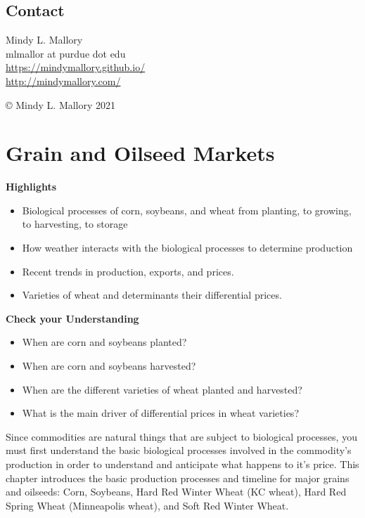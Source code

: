 \documentclass[
]{book}
\providecommand{\tightlist}{%
  \setlength{\itemsep}{0pt}\setlength{\parskip}{0pt}}
\begin{document}
\hypertarget{contact}{%
\section*{Contact}\label{contact}}

Mindy L. Mallory\\
mlmallor at purdue dot edu\\
\url{https://mindymallory.github.io/}~\\
\url{http://mindymallory.com/}

© Mindy L. Mallory 2021

\hypertarget{grain-and-oilseed-markets}{%
\chapter{Grain and Oilseed Markets}\label{grain-and-oilseed-markets}}

\textbf{Highlights}

\begin{itemize}
\tightlist
\item
  Biological processes of corn, soybeans, and wheat from planting, to growing, to harvesting, to storage
\item
  How weather interacts with the biological processes to determine production
\item
  Recent trends in production, exports, and prices.
\item
  Varieties of wheat and determinants their differential prices.
\end{itemize}

\textbf{Check your Understanding}

\begin{itemize}
\tightlist
\item
  When are corn and soybeans planted?
\item
  When are corn and soybeans harvested?
\item
  When are the different varieties of wheat planted and harvested?
\item
  What is the main driver of differential prices in wheat varieties?
\end{itemize}

Since commodities are natural things that are subject to biological processes, you must first understand the basic biological processes involved in the commodity's production in order to understand and anticipate what happens to it's price. This chapter introduces the basic production processes and timeline for major grains and oilseeds: Corn, Soybeans, Hard Red Winter Wheat (KC wheat), Hard Red Spring Wheat (Minneapolis wheat), and Soft Red Winter Wheat.
\end{document}

